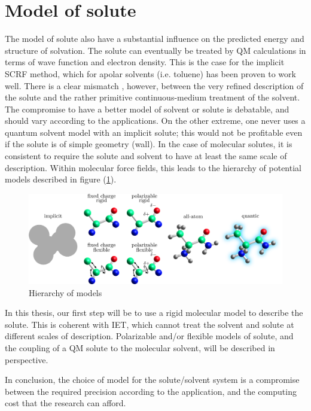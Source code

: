 \section{Model of solute}

The model of solute also have a substantial influence on the predicted
energy and structure of solvation. The solute can eventually be treated
by \acs{QM} calculations in terms of wave function and electron density.
This is the case for the implicit SCRF method, which for apolar solvents
(i.e. toluene) has been proven to work well. There is a clear mismatch
, however, between the very refined description of the solute and
the rather primitive continuous-medium treatment of the solvent. The
compromise to have a better model of solvent or solute is debatable,
and should vary according to the applications. On the other extreme,
one never uses a quantum solvent model with an implicit solute; this
would not be profitable even if the solute is of simple geometry (wall).
In the case of molecular solutes, it is consistent to require the
solute and solvent to have at least the same scale of description.
Within molecular force fields, this leads to the hierarchy of potential
models described in figure (\ref{fig:Hierarchy-of-models}).
\begin{figure}[h]
\centering{}%
\noindent\begin{minipage}[t]{1\columnwidth}%
\begin{center}
\includegraphics[width=1\columnwidth]{_figure/solute}
\par\end{center}%
\end{minipage}\caption{Hierarchy of models\label{fig:Hierarchy-of-models}}
\end{figure}

In this thesis, our first step will be to use a rigid molecular model
to describe the solute. This is coherent with IET, which cannot treat
the solvent and solute at different scales of description. Polarizable
and/or flexible models of solute, and the coupling of a QM solute
to the molecular solvent, will be described in perspective.

In conclusion, the choice of model for the solute/solvent system is
a compromise between the required precision according to the application,
and the computing cost that the research can afford.
